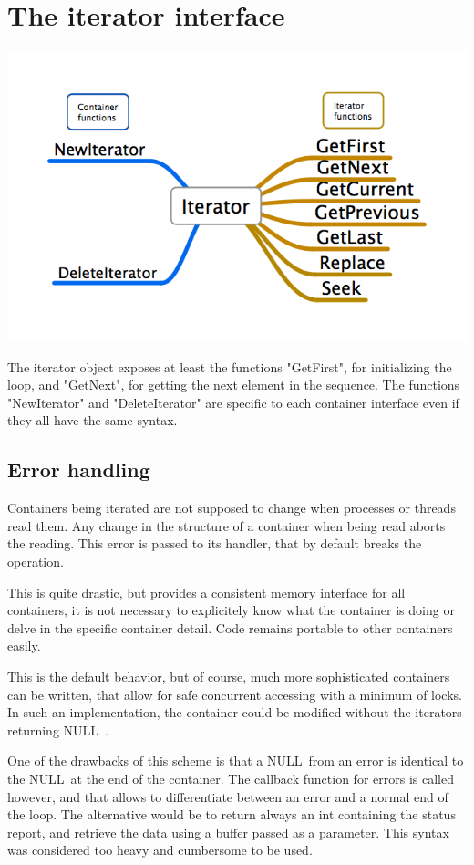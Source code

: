 \documentclass[12pt,a4paper]{memoir} %
\newif\iftth
\newcommand{\Null}{{\iftth \ NULL \else \footnotesize NULL\  \fi}}
\begin{document}
\section{The iterator interface}
\includegraphics[scale=0.62]{Iterator.png}\par
The iterator object exposes at least the functions "GetFirst", for initializing the loop, and "GetNext", for getting the next element in the sequence. 
The functions "NewIterator" and "DeleteIterator" are specific to each container interface even if they all have the same syntax.

\subsection{Error handling}

Containers being iterated are not supposed to change when processes or threads read them. Any change in the structure of a container when being read aborts the reading. This error is passed to its handler, that by default breaks the operation.

This is quite drastic, but provides a consistent memory interface for all containers, it is not necessary to explicitely know what the container is doing or delve in the specific container detail. Code remains portable to other containers easily.

This is the default behavior, but  of course, much more sophisticated containers can be written, that allow for safe concurrent accessing with a minimum of locks. In such an implementation, the container could be modified without the iterators returning \Null.

One of the drawbacks of this scheme is that a \Null from an error is identical to the \Null at the end of the container. The callback function for errors is called however, and that allows to differentiate between an error and a normal end of the loop. The alternative would be to return always an int containing the status report, and retrieve the data using a buffer passed as a parameter. This syntax was considered too heavy and cumbersome to be used.
\end{document}
